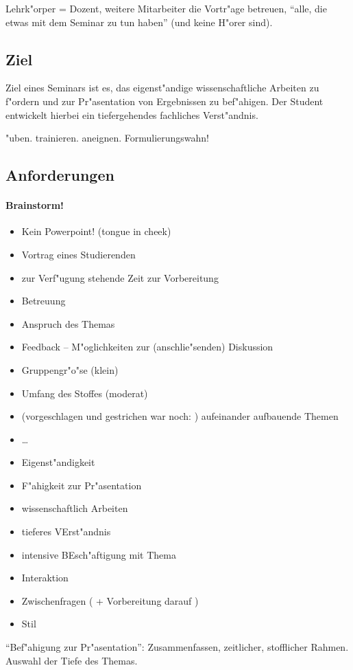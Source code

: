 \begin{kcmt}\begin{komacmt}
Lehrk"orper = Dozent, weitere Mitarbeiter die Vortr"age betreuen, "`alle, die etwas mit dem Seminar zu tun haben"' (und keine H"orer sind).
\end{komacmt}\end{kcmt}

\subsection{Ziel} 
	Ziel eines Seminars ist es, das eigenst"andige wissenschaftliche Arbeiten zu f"ordern
	und zur Pr"asentation von Ergebnissen zu bef"ahigen. Der Student entwickelt hierbei ein
	tiefergehendes fachliches Verst"andnis.

\begin{kcmt}\begin{komacmt}
"uben. trainieren. aneignen. Formulierungswahn!
\end{komacmt}\end{kcmt}


\subsection{Anforderungen}
\begin{kcmt}\begin{komacmt}
\paragraph{Brainstorm!} \begin{itemize}
	\item Kein Powerpoint! (tongue in cheek)
	\item Vortrag eines Studierenden 
	\item zur Verf"ugung stehende Zeit zur Vorbereitung
	\item Betreuung
	\item Anspruch des Themas
	\item Feedback -- M"oglichkeiten zur (anschlie"senden) Diskussion
	\item Gruppengr"o"se (klein)
	\item Umfang des Stoffes (moderat)
	\item (vorgeschlagen und gestrichen  war noch: ) aufeinander aufbauende Themen
	\item \dots
	\item Eigenst"andigkeit
	\item F"ahigkeit zur Pr"asentation
	\item wissenschaftlich Arbeiten
	\item tieferes VErst"andnis
	\item intensive BEsch"aftigung mit Thema
	\item Interaktion
	\item Zwischenfragen ( + Vorbereitung darauf )
	\item Stil
\end{itemize}
"`Bef"ahigung zur Pr"asentation"': Zusammenfassen, zeitlicher, stofflicher Rahmen.
Auswahl der Tiefe des Themas.
\end{komacmt}\end{kcmt}

